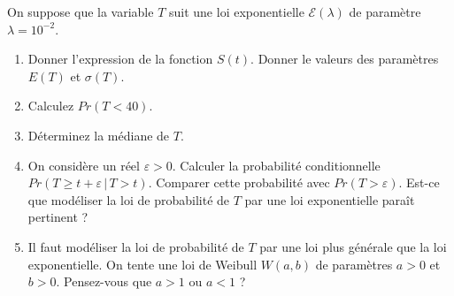 \documentclass[11pt]{article}
\numberwithin{equation}{section}
\begin{document}
On suppose que la variable $T$ suit une loi exponentielle $\mathcal{E}(\lambda)$ de param\`etre 
$\lambda=10^{-2}$. 
\begin{enumerate}
\item Donner l'expression de la fonction $S(t)$. Donner le valeurs des param\`etres 
$E(T)$ et $\sigma(T)$.
\item Calculez $Pr(T<40)$. 
\item D\'eterminez la m\'ediane de $T$.
\item On consid\`ere un r\'eel $\varepsilon>0$. 
Calculer la probabilit\'e conditionnelle $Pr(T\geq t + \varepsilon\, | \, T>t)$.
Comparer cette probabilité avec $Pr(T>\varepsilon)$. 
Est-ce que modéliser la loi de probabilité de $T$ par une loi exponentielle paraît pertinent ? 
\item Il faut modéliser la loi de probabilité de $T$ par une loi plus générale que la loi 
exponentielle. On tente une loi de Weibull $W(a,b)$ de paramètres $a>0$ et $b>0$. Pensez-vous que
$a>1$ ou $a<1$ ? 
\end{enumerate}

\iffalse %
{\bf 2)} On suppose maintenant que $T$ suit une loi de Weibull $W(a,b)$. Donnez $S(t)$.

On fixe un r\'eel $\varepsilon>0$. Donnez l'expression de la probabilit\'e $Pr(T\geq t + \varepsilon\, | \, T>t)$.
En supposant que $\frac{\varepsilon}{t}\approx 0$, on pourrait alors d\'emontrer (mais on ne le fera pas),
que  
$Pr(T\geq t + \varepsilon\, | \, T>t)\approx exp(-\frac{a\varepsilon}{b^a} t^{a-1})$. Etudiez l'effet du 
vieillissement \`a partir de cette probabilit\'e.

{\bf 3)} Un organe est compos\'e de $N$ cellules. On note $T_1,\hdots, T_N$ les variables al\'eatoires repr\'esentant les
temps de vie des cellules jusqu'\`a l'apparition d'une mutation. 
On suppose que ces $N$ variables sont ind\'ependantes et sont toutes distribu\'ees selon la loi exponentielle de la question 1).
On suppose que la premi\`ere mutation d'une des cellules suffit pour d\'eclencher une tumeur. On note $X$ la dur\'ee de vie de l'organe. 
On a alors $X=\min \{T_1,\hdots, T_N\}$.
D\'eterminez la fonction de survie $S_X(t)$ de l'organe. Calculez $S_X(40)$ pour $N=100$.\\

\fi %
\end{document}
